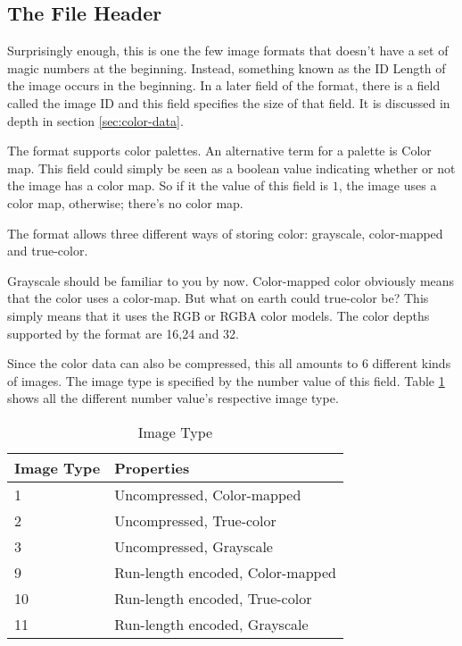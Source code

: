 \begin{refsection}
  \section{The File Header}


  Surprisingly enough, this is one the few image formats that doesn't
  have a set of magic numbers at the beginning. Instead, something
  known as the ID Length of the image occurs in the beginning. In a
  later field of the format, there is a field called the image
  ID and this field specifies the size of that field. It is discussed
  in depth in section \ref{sec:color-data}.


  The \tga format supports color palettes. An alternative term for a
  palette is Color map. This field could simply be
  seen as a boolean value indicating whether or not the image has a
  color map. So if it the value of this field is $1$, the image uses a
  color map, otherwise; there's no color map.


  The \tga format allows three different ways of storing color:
  grayscale, color-mapped and
  true-color.

  Grayscale should be familiar to you by now. Color-mapped color
  obviously means that the color uses a color-map. But what on earth
  could true-color be? This simply means that it uses the RGB or RGBA
  color models. The color depths supported by the \tga format are
  16,24 and 32.

  Since the color data can also be compressed, this all amounts to $6$
  different kinds of images. The image type is specified by the number
  value of this field. Table \ref{tab:imgtype} shows all the different
  number value's respective image type.

  \begin{table}
    \centering
    \begin{tabular}{ll}
      \toprule
      Image Type & Properties \\
      \midrule
      1 & Uncompressed, Color-mapped \\
      2 & Uncompressed, True-color \\
      3 & Uncompressed, Grayscale\\
      9 & Run-length encoded, Color-mapped \\
      10 & Run-length encoded, True-color \\
      11 & Run-length encoded, Grayscale\\
      \bottomrule
    \end{tabular}
    \caption{Image Type}
    \label{tab:imgtype}
  \end{table}


\end{refsection}
